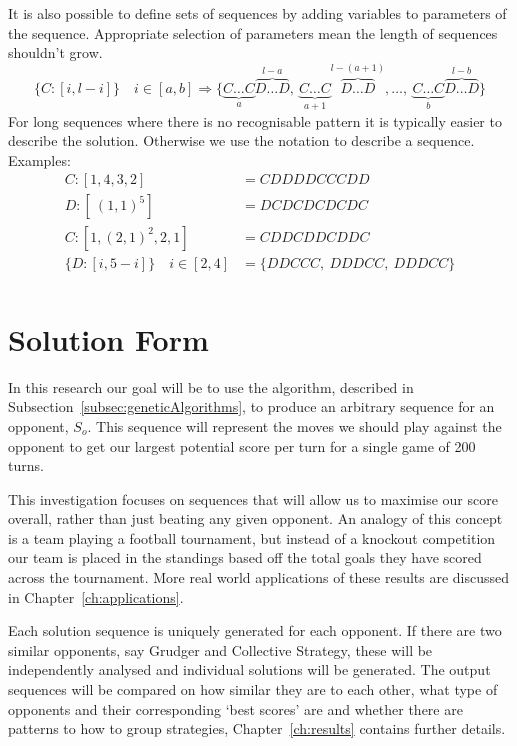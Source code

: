 It is also possible to define sets of sequences by adding variables to parameters of the sequence.
Appropriate selection of parameters mean the length of sequences shouldn't grow.
\[ \{C:[i,l-i]\} \quad i\in [a,b] \Rightarrow \{\underbrace{C\ldots C}_{a}\overbrace{D\ldots D}^{l-a},\ \underbrace{C\ldots C}_{a+1}\overbrace{D\ldots D}^{l-(a+1)},\ldots ,\ \underbrace{C\ldots C}_{b}\overbrace{D\ldots D}^{l-b}\} \]
For long sequences where there is no recognisable pattern it is typically easier to describe the solution.
Otherwise we use the notation to describe a sequence.
Examples:
\begin{align}
    C:[1,4,3,2] &= CDDDDCCCDD\\
    D:[\ (1,1)^{5}] &= DCDCDCDCDC\\
    C:[1,(2,1)^{2},2,1] &= CDDCDDCDDC\\
    \{D:[i,5-i]\} \quad i\in [2,4] &= \{DDCCC,\ DDDCC,\ DDDCC\}\\
\end{align}

\section{Solution Form}\label{sec:solutionForm}
In this research our goal will be to use the algorithm, described in Subsection~\ref{subsec:geneticAlgorithms}, to produce an arbitrary sequence for an opponent, \(S_o\).
This sequence will represent the moves we should play against the opponent to get our largest potential score per turn for a single game of 200 turns.

This investigation focuses on sequences that will allow us to maximise our score overall, rather than just beating any given opponent.
An analogy of this concept is a team playing a football tournament, but instead of a knockout competition our team is placed in the standings based off the total goals they have scored across the tournament.
More real world applications of these results are discussed in Chapter~\ref{ch:applications}.

Each solution sequence is uniquely generated for each opponent.
If there are two similar opponents, say Grudger and Collective Strategy, these will be independently analysed and individual solutions will be generated.
The output sequences will be compared on how similar they are to each other, what type of opponents and their corresponding `best scores' are and whether there are patterns to how to group strategies, Chapter~\ref{ch:results} contains further details.

